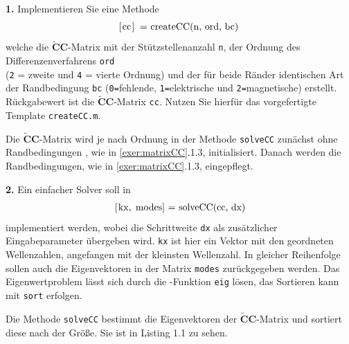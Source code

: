 \documentclass[Protokollheft.tex]{subfiles}
\begin{document}
	\begin{framed}
		\noindent \textbf{1.} Implementieren Sie eine Methode
		\begin{align}
			\lstinline{[cc] = createCC(n, ord, bc)}\; \label{meth:createCC}
		\end{align}     
		welche die $\tilde{\textbf{C}}\textbf{C}$-Matrix mit der Stützstellenanzahl \lstinline{n}, der Ordnung des Differenzenverfahrens
		\lstinline{ord}\\ (\lstinline{2} = zweite und \lstinline{4} = vierte Ordnung) und der für beide Ränder identischen Art der Randbedingung \lstinline{bc} (\lstinline{0=}fehlende, \lstinline{1=}elektrische und  \lstinline{2=}magnetische) erstellt.
		Rückgabewert ist die $\tilde{\textbf{C}}\textbf{C}$-Matrix \lstinline{cc}. Nutzen Sie hierfür das vorgefertigte Template \lstinline{createCC.m}.\label{exer:createCC}
	\end{framed}
	Die $\tilde{\textbf{C}}\textbf{C}$-Matrix wird je nach Ordnung in der Methode \lstinline{solveCC} zunächst ohne Randbedingungen , wie in \ref{exer:matrixCC}.1.3, initialisiert. Danach werden die Randbedingungen, wie in \ref{exer:matrixCC}.1.3, eingepflegt.
	
	\begin{framed}
		\noindent \textbf{2.} Ein einfacher Solver soll in
		\begin{align}
			\lstinline{[kx, modes] = solveCC(cc, dx)} \label{meth:solveCC}
		\end{align}
		implementiert werden, wobei die Schrittweite \lstinline{dx} als zusätzlicher Eingabeparameter übergeben wird.
		\lstinline{kx} ist hier ein Vektor mit den geordneten Wellenzahlen, angefangen mit der kleinsten Wellenzahl. In gleicher
		Reihenfolge sollen auch die Eigenvektoren in der Matrix \lstinline{modes} zurückgegeben werden.
		Das Eigenwertproblem lässt sich durch die \matlab-Funktion \lstinline{eig} lösen, das Sortieren kann mit \lstinline{sort} erfolgen.\label{exer:solveCC}
	\end{framed}
	\noindent
	Die Methode \lstinline{solveCC} bestimmt die Eigenvektoren der $\tilde{\textbf{C}}\textbf{C}$-Matrix und sortiert diese nach der Größe. Sie ist in Listing 1.1 zu sehen.
	
	
\end{document}
